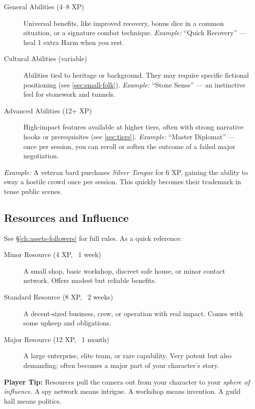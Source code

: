 \begin{description}
  \item[General Abilities (4–8 XP)]  
    Universal benefits, like improved recovery, bonus dice in a common
    situation, or a signature combat technique.  
    \emph{Example:} ``Quick Recovery'' — heal 1 extra Harm when you rest.

  \item[Cultural Abilities (variable)]  
    Abilities tied to heritage or background. They may require specific
    fictional positioning (see \ref{sec:small-folk}).  
    \emph{Example:} ``Stone Sense'' — an instinctive feel for stonework and tunnels.

  \item[Advanced Abilities (12+ XP)]  
    High‑impact features available at higher tiers, often with strong narrative
    hooks or prerequisites (see \ref{sec:tiers}).  
    \emph{Example:} ``Master Diplomat'' — once per session, you can reroll or
    soften the outcome of a failed major negotiation.
\end{description}

\emph{Example:} A veteran bard purchases \emph{Silver Tongue} for 6 XP,
gaining the ability to sway a hostile crowd once per session. This quickly
becomes their trademark in tense public scenes.

\subsection{Resources and Influence}
See \S\ref{ch:assets-followers} for full rules. As a quick reference:

\begin{description}
  \item[Minor Resource (4 XP, ~1 week)]  
    A small shop, basic workshop, discreet safe house, or minor contact
    network. Offers modest but reliable benefits.

  \item[Standard Resource (8 XP, ~2 weeks)]  
    A decent‑sized business, crew, or operation with real impact. Comes with
    some upkeep and obligations.

  \item[Major Resource (12 XP, ~1 month)]  
    A large enterprise, elite team, or rare capability. Very potent but also
    demanding; often becomes a major part of your character's story.
\end{description}

\noindent\textbf{Player Tip:} Resources pull the camera out from your character
to your \emph{sphere of influence}. A spy network means intrigue. A workshop
means invention. A guild hall means politics.

